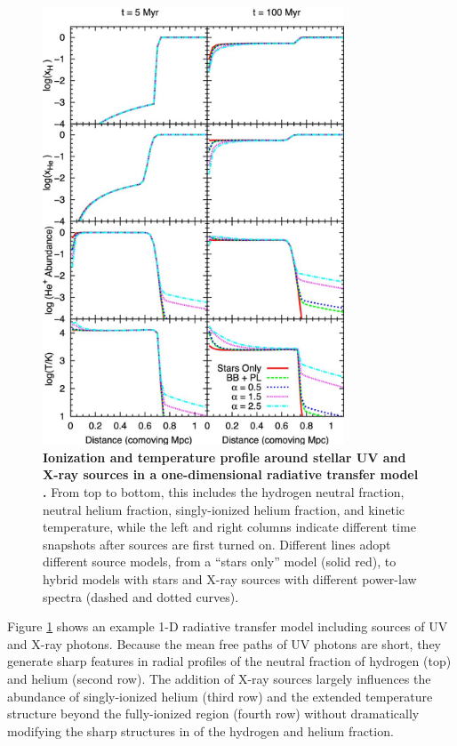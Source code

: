 \begin{figure}[]
\begin{center}
\includegraphics[width=0.8\textwidth]{Mirocha/knevitt2014_fig3.pdf}
\end{center}
\caption{{\bf Ionization and temperature profile around stellar UV and X-ray sources in a one-dimensional radiative transfer model \cite{Knevitt2014}.} From top to bottom, this includes the hydrogen neutral fraction, neutral helium fraction, singly-ionized helium fraction, and kinetic temperature, while the left and right columns indicate different time snapshots after sources are first turned on. Different lines adopt different source models, from a ``stars only'' model (solid red), to hybrid models with stars and X-ray sources with different power-law spectra (dashed and dotted curves). }
\label{fig:rt1d}
\end{figure}

Figure \ref{fig:rt1d} shows an example 1-D radiative transfer model including sources of UV and X-ray photons. Because the mean free paths of UV photons are short, they generate sharp features in radial profiles of the neutral fraction of hydrogen (top) and helium (second row). The addition of X-ray sources largely influences the abundance of singly-ionized helium (third row) and the extended temperature structure beyond the fully-ionized region (fourth row) without dramatically modifying the sharp structures in of the hydrogen and helium fraction. 

